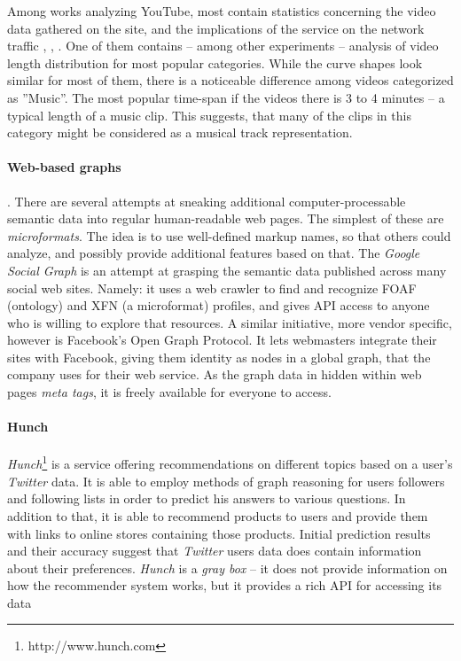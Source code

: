 Among works analyzing YouTube, most contain statistics concerning the video
data gathered on the site, and the implications of the service on the network
traffic \cite{i-tube-you-tube}, \cite{views-from-the-edge},
\cite{statistics-and-social-network}. One of them
\cite{statistics-and-social-network} contains -- among other experiments --
analysis of video length distribution for most popular categories.  While the
curve shapes look similar for most of them, there is a noticeable difference
among videos categorized as ''Music''. The most popular time-span if the videos
there is 3 to 4 minutes -- a typical length of a music clip. This suggests,
that many of the clips in this category might be considered as a musical track
representation.

\paragraph{Web-based graphs}. There are several attempts at sneaking additional
computer-processable semantic data into regular human-readable web pages.  The
simplest of these are \textit{microformats}. The idea is to use well-defined
markup names, so that others could analyze, and possibly provide additional
features based on that.  The \textit{Google Social Graph} is an attempt at grasping
the semantic data published across many social web sites. Namely: it uses a web
crawler to find and recognize FOAF (ontology) and XFN (a microformat) profiles,
and gives API access to anyone who is willing to explore that resources. A
similar initiative, more vendor specific, however is Facebook's Open Graph
Protocol. It lets webmasters integrate their sites with Facebook, giving them
identity as nodes in a global graph, that the company uses for their
web service. As the graph data in hidden within web pages \textit{meta tags},
it is freely available for everyone to access.

\paragraph{Hunch}
\textit{Hunch}\footnote{http://www.hunch.com} is a service offering recommendations on different topics based on a user's
\textit{Twitter} data. It is able to employ methods of graph reasoning for users followers and following lists
in order to predict his answers to various questions. In addition to that, it is able to recommend products
to users and provide them with links to online stores containing those products.
Initial prediction results and their accuracy suggest that
\textit{Twitter} users data does contain information about their preferences. \textit{Hunch} is a \textit{gray box}
--  it does not provide information on how the recommender system works, but it provides a rich
API for accessing its data

